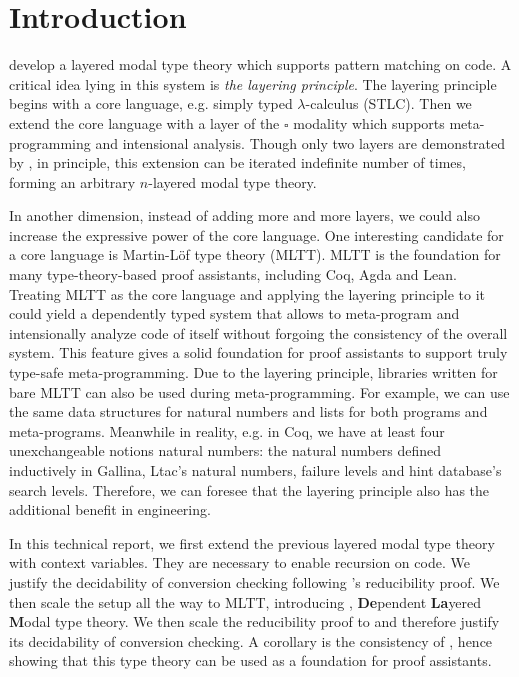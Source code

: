 \section{Introduction}

\citet{hu2024layered} develop a layered modal type theory which supports pattern
matching on code. %
A critical idea lying in this system is \emph{the layering principle}. %
The layering principle begins with a core language, e.g. simply typed
$\lambda$-calculus (STLC). %
Then we extend the core language with a layer of the $\square$ modality which supports
meta-programming and intensional analysis. %
Though only two layers are demonstrated by \citet{hu2024layered}, in principle, this
extension can be iterated indefinite number of times, forming an arbitrary $n$-layered
modal type theory. %

In another dimension, instead of adding more and more layers, we could also increase
the expressive power of the core language. %
One interesting candidate for a core language is Martin-L\"of type theory (MLTT). %
MLTT is the foundation for many type-theory-based proof assistants, including Coq,
Agda and Lean. %
Treating MLTT as the core language and applying the layering principle to it could
yield a dependently typed system that allows to meta-program and intensionally analyze
code of itself without forgoing the consistency of the overall system. %
This feature gives a solid foundation for proof assistants to support truly type-safe
meta-programming. %
Due to the layering principle, libraries written for bare MLTT can also be used during
meta-programming. %
For example, we can use the same data structures for natural numbers and lists for
both programs and meta-programs. %
Meanwhile in reality, e.g. in Coq, we have at least four unexchangeable notions
natural numbers: the natural numbers defined inductively in Gallina, Ltac's natural
numbers, failure levels and hint database's search levels. %
Therefore, we can foresee that the layering principle also has the additional benefit
in engineering.

In this technical report, we first extend the previous layered modal type theory with
context variables. %
They are necessary to enable recursion on code. %
We justify the decidability of conversion checking following
\citet{abel_decidability_2017}'s reducibility proof. %
We then scale the setup all the way to MLTT, introducing \delamlang,
\textbf{De}pendent \textbf{La}yered \textbf{M}odal type theory. %
We then scale the reducibility proof to \delamlang and therefore justify its
decidability of conversion checking. %
A corollary is the consistency of \delamlang, hence showing that this type theory can
be used as a foundation for proof assistants.
